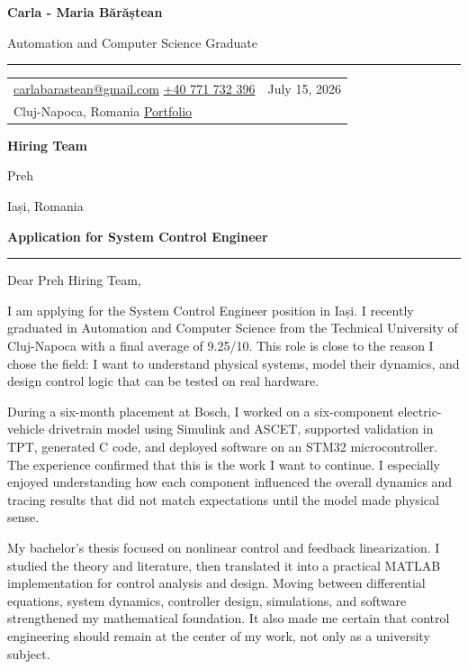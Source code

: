 \documentclass[11pt,a4paper]{article}
\newcommand{\contactseparator}{\hspace{0.55em}{\color{CVAccent}\textbar}\hspace{0.55em}}
\begin{document}
\color{CVInk}

{\fontsize{24}{28}\selectfont\bfseries Carla - Maria Bărăștean}\par
\vspace{0.08cm}
{\large Automation and Computer Science Graduate}\par

\vspace{0.28cm}
{\color{CVAccent}\rule{\textwidth}{1.2pt}}
\vspace{0.18cm}

\begin{tabularx}{\textwidth}{@{}Xr@{}}
\href{mailto:carlabarastean@gmail.com}{carlabarastean@gmail.com}
\contactseparator
\href{tel:+40771732396}{+40 771 732 396}
& July 15, 2026 \\
Cluj-Napoca, Romania
\contactseparator
\href{https://portofolio-carla-barastean.netlify.app}{Portfolio}
& \\
\end{tabularx}

\vspace{0.55cm}
\textbf{Hiring Team}\par
Preh\par
Iași, Romania

\vspace{0.42cm}
{\large\bfseries Application for System Control Engineer}\par
{\color{CVAccent}\rule{5.7cm}{0.8pt}}

\vspace{0.28cm}
Dear Preh Hiring Team,

I am applying for the System Control Engineer position in Iași. I recently graduated in Automation and Computer Science from the Technical University of Cluj-Napoca with a final average of 9.25/10. This role is close to the reason I chose the field: I want to understand physical systems, model their dynamics, and design control logic that can be tested on real hardware.

During a six-month placement at Bosch, I worked on a six-component electric-vehicle drivetrain model using Simulink and ASCET, supported validation in TPT, generated C code, and deployed software on an STM32 microcontroller. The experience confirmed that this is the work I want to continue. I especially enjoyed understanding how each component influenced the overall dynamics and tracing results that did not match expectations until the model made physical sense.

My bachelor's thesis focused on nonlinear control and feedback linearization. I studied the theory and literature, then translated it into a practical MATLAB implementation for control analysis and design. Moving between differential equations, system dynamics, controller design, simulations, and software strengthened my mathematical foundation. It also made me certain that control engineering should remain at the center of my work, not only as a university subject.
\end{document}
